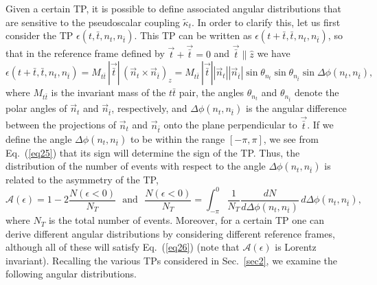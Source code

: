 \documentclass[aps,preprint,tightenlines,floatfix,superscriptaddress,nofootinbib,showpacs]{revtex4-1}
\def\beq{\begin{equation}}
\def\eeq{\end{equation}}
\def\tbar{\bar{t}}
\def\kpt{\tilde{\kappa}_t}
\begin{document}
Given a certain TP, it is possible to define associated angular
distributions that are sensitive to the pseudoscalar coupling
$\kpt$. In order to clarify this, let us first consider the TP
$\epsilon(t,\tbar,n_t,n_{\tbar})$. This TP can be written as
$\epsilon(t+\tbar,\tbar,n_t,n_{\tbar})$, so that in the reference frame
defined by $\vec{t}+\vec{\tbar} =0$ and $\vec{\tbar}\parallel \hat{z}$
we have
%
\beq
\label{eq25}
\epsilon(t+\tbar,\tbar,n_t,n_{\tbar})=M_{t\tbar}\,|\vec{\tbar}|\,(\vec{n}_t\times \vec{n}_{\tbar})_z=M_{t\tbar}\,|\vec{\tbar}||\vec{n}_t||\vec{n}_{\tbar}|\sin\theta_{n_t}\sin\theta_{n_{\tbar}}\sin \Delta \phi(n_t,n_{\tbar}),
\eeq
%
where $M_{t\tbar}$ is the invariant mass of the $t\tbar$ pair, the
angles $\theta_{n_t}$ and $\theta_{n_{\tbar}}$ denote the polar angles
of $\vec{n}_t$ and $\vec{n}_{\tbar}$, respectively, and 
$\Delta\phi(n_t,n_{\tbar})$ is the angular difference between the
projections of $\vec{n}_t$ and $\vec{n}_{\tbar}$ onto the plane
perpendicular to $\vec{\bar{t}}$. If we define the angle
$\Delta\phi(n_t,n_{\tbar})$  to be within the
range $[-\pi,\pi]$, we see from Eq.~(\ref{eq25}) that its sign will
determine the sign of the TP. Thus, the distribution of the
number of events with respect to the angle
$\Delta\phi(n_t,n_{\tbar})$ is related to the asymmetry of the TP,
%
\beq
\label{eq26}
\mathcal{A}(\epsilon)=1-2\frac{N(\epsilon < 0)}{N_T}\,\,\mbox{ and }\,\,\frac{N(\epsilon < 0)}{N_T}=\int^0_{-\pi}\frac{1}{N_T}\frac{dN}{d\Delta\phi(n_t,n_{\tbar})}\,d\Delta\phi(n_t,n_{\tbar}),
\eeq  
%
where $N_T$ is the total number of events.
Moreover, for a certain TP
one can derive different angular distributions by considering
different reference frames, although all of these will satisfy
Eq.~(\ref{eq26}) (note that $\mathcal{A}(\epsilon)$
is Lorentz invariant). Recalling the various TPs considered
in Sec.~\ref{sec2}, we examine the following angular distributions.
\end{document}
